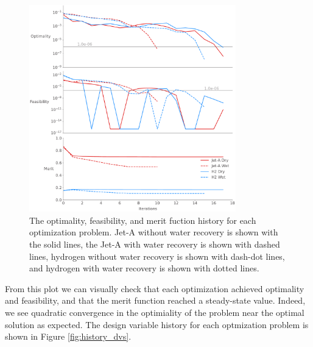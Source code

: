 \documentclass[conf]{new-aiaa}
\begin{document}
\begin{figure}[hbt!]
    \centering
    \includegraphics[width=0.8\textwidth]{opt_summary.pdf}
    \caption{The optimality, feasibility, and merit fuction history for each optimization problem.
        Jet-A without water recovery is shown with the solid lines, the Jet-A with water recovery is shown with dashed lines, hydrogen without water recovery is shown with dash-dot lines, and hydrogen with water recovery is shown with dotted lines.}
    \label{fig:history_summary}
\end{figure}

From this plot we can visually check that each optimization achieved optimality and feasibility, and that the merit function reached a steady-state value.
Indeed, we see quadratic convergence in the optimiality of the problem near the optimal solution as expected.
The design variable history for each optmization problem is shown in Figure \ref{fig:history_dvs}.
\end{document}
